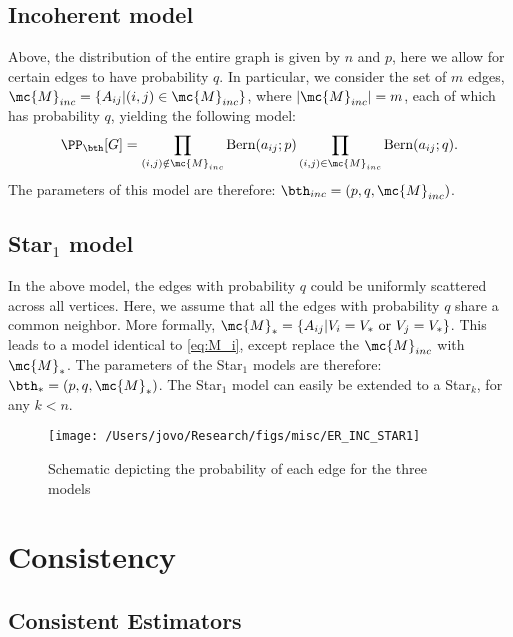 \subsection{Incoherent model} %
\label{ssub:incoherent_subspace}

Above, the distribution of the entire graph is given by $n$ and $p$, here we allow for certain edges to have probability $q$.  In particular, we consider the set of $m$ edges, $\mc{M}_{inc}=\{A_{ij} | (i,j) \in \mc{M}_{inc}\}$, where $|\mc{M}_{inc}|=m$, each of which has probability $q$, yielding the following model:
\begin{equation} \label{eq:M_i}
	\PP_{\bth}[G] = \prod_{(i,j) \notin \mc{M}_{inc}} \text{Bern}(a_{ij}; p) \prod_{(i,j) \in \mc{M}_{inc}} \text{Bern}(a_{ij}; q).
\end{equation}
The parameters of this model are therefore: $\bth_{inc}=(p,q,\mc{M}_{inc})$.




\subsection{Star$_1$  model} %
\label{ssub:incoherent_subspace}

In the above model, the edges with probability $q$ could be uniformly scattered across all vertices.  Here, we assume that all the edges with probability $q$ share a common neighbor.  More formally, $\mc{M}_*=\{A_{ij} | V_i = V_* \text{ or } V_j = V_*\}$.  This leads to a model identical to \eqref{eq:M_i}, except replace the $\mc{M}_{inc}$ with $\mc{M}_*$. The parameters of the Star$_1$ models are therefore: $\bth_{*}=(p,q,\mc{M}_*)$.  The Star$_1$ model can easily be extended to a Star$_k$, for any $k < n$. 

\begin{figure}[h!]
\centering \texttt{[image: /Users/jovo/Research/figs/misc/ER\_INC\_STAR1]}
\caption{Schematic depicting the probability of each edge for the three models}
\label{fig:models}
\end{figure}



\section{Consistency} %
\label{sub:model_estimates}


\subsection{Consistent Estimators} %
\label{sub:consistent_estimators}

